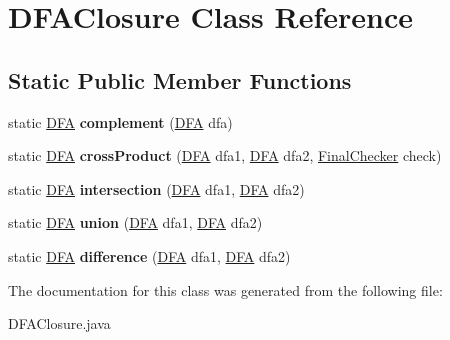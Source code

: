 \hypertarget{class_d_f_a_closure}{}\section{D\+F\+A\+Closure Class Reference}
\label{class_d_f_a_closure}
\subsection*{Static Public Member Functions}
\begin{DoxyCompactItemize}
\item 
\mbox{\label{class_d_f_a_closure_a7edb7239e88099855425f4a291803515}} 
static \mbox{\hyperlink{class_d_f_a}{D\+FA}} {\bfseries complement} (\mbox{\hyperlink{class_d_f_a}{D\+FA}} dfa)
\item 
\mbox{\label{class_d_f_a_closure_aea5637e966d6ad5cceb52a53b32dab0a}} 
static \mbox{\hyperlink{class_d_f_a}{D\+FA}} {\bfseries cross\+Product} (\mbox{\hyperlink{class_d_f_a}{D\+FA}} dfa1, \mbox{\hyperlink{class_d_f_a}{D\+FA}} dfa2, \mbox{\hyperlink{interface_final_checker}{Final\+Checker}} check)
\item 
\mbox{\label{class_d_f_a_closure_a13d86ce9e388f02ead985b51fdc839ea}} 
static \mbox{\hyperlink{class_d_f_a}{D\+FA}} {\bfseries intersection} (\mbox{\hyperlink{class_d_f_a}{D\+FA}} dfa1, \mbox{\hyperlink{class_d_f_a}{D\+FA}} dfa2)
\item 
\mbox{\label{class_d_f_a_closure_a24760d28d696dccd5b088f7f69a4ce70}} 
static \mbox{\hyperlink{class_d_f_a}{D\+FA}} {\bfseries union} (\mbox{\hyperlink{class_d_f_a}{D\+FA}} dfa1, \mbox{\hyperlink{class_d_f_a}{D\+FA}} dfa2)
\item 
\mbox{\label{class_d_f_a_closure_adf5a94ea03eb3b6c8342eb77c3d8a750}} 
static \mbox{\hyperlink{class_d_f_a}{D\+FA}} {\bfseries difference} (\mbox{\hyperlink{class_d_f_a}{D\+FA}} dfa1, \mbox{\hyperlink{class_d_f_a}{D\+FA}} dfa2)
\end{DoxyCompactItemize}


The documentation for this class was generated from the following file\+:\begin{DoxyCompactItemize}
\item 
D\+F\+A\+Closure.\+java\end{DoxyCompactItemize}
